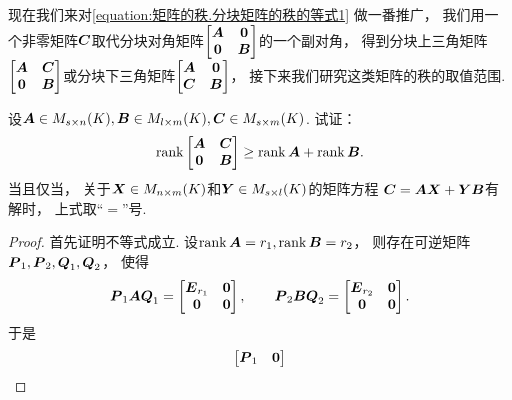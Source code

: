 现在我们来对\cref{equation:矩阵的秩.分块矩阵的秩的等式1} 做一番推广，
我们用一个非零矩阵\(\boldsymbol{C}\)取代分块对角矩阵\(\begin{bmatrix}
	\boldsymbol{A} & \boldsymbol0 \\
	\boldsymbol0 & \boldsymbol{B}
\end{bmatrix}\)的一个副对角，
得到分块上三角矩阵\(\begin{bmatrix}
	\boldsymbol{A} & \boldsymbol{C} \\
	\boldsymbol0 & \boldsymbol{B}
\end{bmatrix}\)或分块下三角矩阵\(\begin{bmatrix}
	\boldsymbol{A} & \boldsymbol0 \\
	\boldsymbol{C} & \boldsymbol{B}
\end{bmatrix}\)，
接下来我们研究这类矩阵的秩的取值范围.
\begin{example}
设\(\boldsymbol{A} \in M_{s \times n}(K),
\boldsymbol{B} \in M_{l \times m}(K),
\boldsymbol{C} \in M_{s \times m}(K)\).
试证：\begin{equation}
	\rank\begin{bmatrix}
		\boldsymbol{A} & \boldsymbol{C} \\
		\boldsymbol0 & \boldsymbol{B}
	\end{bmatrix} \geq \rank\boldsymbol{A} + \rank\boldsymbol{B}.
	\label{equation:矩阵的秩.分块矩阵的秩的不等式}
\end{equation}
当且仅当，
关于\(\boldsymbol{X} \in M_{n \times m}(K)\)和\(\boldsymbol{Y} \in M_{s \times l}(K)\)的矩阵方程
\(\boldsymbol{C}=\boldsymbol{A}\boldsymbol{X}+\boldsymbol{Y}\boldsymbol{B}\)有解时，
上式取“\(=\)”号.
\begin{proof}
首先证明不等式成立.
设\(\rank\boldsymbol{A}=r_1,
\rank\boldsymbol{B}=r_2\)，
则存在可逆矩阵\(\boldsymbol{P}_1,\boldsymbol{P}_2,\boldsymbol{Q}_1,\boldsymbol{Q}_2\)，
使得\begin{equation*}
	\boldsymbol{P}_1\boldsymbol{A}\boldsymbol{Q}_1 = \begin{bmatrix}
		\boldsymbol{E}_{r_1} & \boldsymbol0 \\
		\boldsymbol0 & \boldsymbol0
	\end{bmatrix},
	\qquad
	\boldsymbol{P}_2\boldsymbol{B}\boldsymbol{Q}_2 = \begin{bmatrix}
		\boldsymbol{E}_{r_2} & \boldsymbol0 \\
		\boldsymbol0 & \boldsymbol0
	\end{bmatrix}.
\end{equation*}
于是\begin{equation*}
	\begin{bmatrix}
		\boldsymbol{P}_1 & \boldsymbol0 \\

\end{bmatrix}
\end{equation*}
\end{proof}
\end{example}
